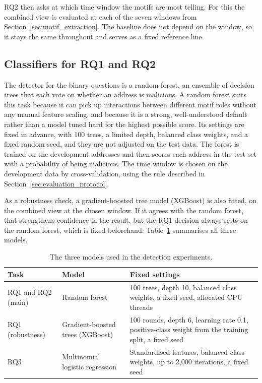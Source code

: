 \documentclass{thesisclass}
\begin{document}
RQ2 then asks at which time window the motifs are most telling. For this the
combined view is evaluated at each of the seven windows from
Section~\ref{sec:motif_extraction}. The baseline does not depend on the window, so
it stays the same throughout and serves as a fixed reference line.

\subsection{Classifiers for RQ1 and RQ2}

The detector for the binary questions is a random forest, an ensemble of decision
trees that each vote on whether an address is malicious. A random forest suits
this task because it can pick up interactions between different motif roles
without any manual feature scaling, and because it is a strong, well-understood
default rather than a model tuned hard for the highest possible score. Its
settings are fixed in advance, with 100 trees, a limited depth, balanced class
weights, and a fixed random seed, and they are not adjusted on the test data. The
forest is trained on the development addresses and then scores each address in the
test set with a probability of being malicious. The time window is chosen on the
development data by cross-validation, using the rule described in
Section~\ref{sec:evaluation_protocol}.

As a robustness check, a gradient-boosted tree model (XGBoost) is also fitted, on
the combined view at the chosen window. If it agrees with the random forest, that
strengthens confidence in the result, but the RQ1 decision always rests on the
random forest, which is fixed beforehand. Table~\ref{tab:results_models}
summarises all three models.

\begin{table}[ht]
\centering
\caption{The three models used in the detection experiments.}
\label{tab:results_models}
\small
\begin{tabular}{@{}p{2.8cm} p{3.7cm} p{6.6cm}@{}}
\toprule
\textbf{Task} & \textbf{Model} & \textbf{Fixed settings} \\
\midrule
RQ1 and RQ2 (main) &
Random forest &
100 trees, depth 10, balanced class weights, a fixed seed, allocated CPU threads \\[2pt]
RQ1 (robustness) &
Gradient-boosted trees (XGBoost) &
100 rounds, depth 6, learning rate 0.1, positive-class weight from the training
split, a fixed seed \\[2pt]
RQ3 &
Multinomial logistic regression &
Standardised features, balanced class weights, up to 2{,}000 iterations, a fixed
seed \\
\bottomrule
\end{tabular}
\end{table}
\end{document}
